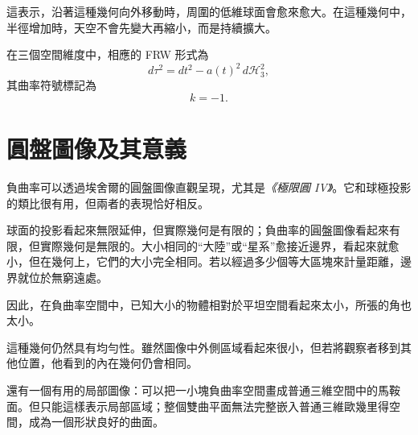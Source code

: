 這表示，沿著這種幾何向外移動時，周圍的低維球面會愈來愈大。在這種幾何中，半徑增加時，天空不會先變大再縮小，而是持續擴大。

在三個空間維度中，相應的 FRW 形式為
\begin{equation}
d\tau^2=dt^2-a(t)^2\,d\mathcal H_3^2,
\end{equation}
其曲率符號標記為
\begin{equation}
k=-1.
\end{equation}

\section{圓盤圖像及其意義}

負曲率可以透過埃舍爾的圓盤圖像直觀呈現，尤其是\emph{《極限圓 IV》}。它和球極投影的類比很有用，但兩者的表現恰好相反。

球面的投影看起來無限延伸，但實際幾何是有限的；負曲率的圓盤圖像看起來有限，但實際幾何是無限的。大小相同的``大陸''或``星系''愈接近邊界，看起來就愈小，但在幾何上，它們的大小完全相同。若以經過多少個等大區塊來計量距離，邊界就位於無窮遠處。

因此，在負曲率空間中，已知大小的物體相對於平坦空間看起來太小，所張的角也太小。

這種幾何仍然具有均勻性。雖然圖像中外側區域看起來很小，但若將觀察者移到其他位置，他看到的內在幾何仍會相同。

\begin{classroomqa}
\end{classroomqa}

\begin{classroomqa}
\end{classroomqa}

\begin{classroomqa}
\end{classroomqa}

還有一個有用的局部圖像：可以把一小塊負曲率空間畫成普通三維空間中的馬鞍面。但只能這樣表示局部區域；整個雙曲平面無法完整嵌入普通三維歐幾里得空間，成為一個形狀良好的曲面。

